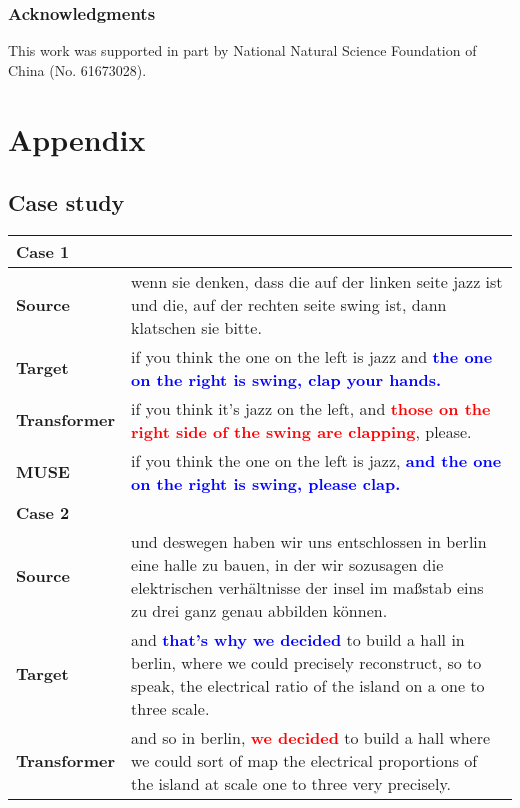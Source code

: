 \documentclass{article} \usepackage{iclr2020_conference,times}
\begin{document}
\subsubsection*{Acknowledgments}
This work was supported in part by National Natural Science Foundation of China (No. 61673028).





\newpage
\appendix
\section{Appendix}
\subsection{Case study}
\begin{table*}[ht]
\centering
\begin{tabular}{p{2cm}p{10cm}}
\toprule
\textbf{Case 1} & \\
\midrule
\textbf{Source} & wenn sie denken, dass die auf der linken seite jazz ist und die, auf der rechten seite swing ist, dann klatschen sie bitte. \\
\midrule
\textbf{Target} & if you think the one on the left is jazz and \textbf{\textcolor{blue}{the one on the right is swing, clap your hands.}} \\
\midrule
 \textbf{Transformer} & if you think it's jazz on the left, and \textbf{\textcolor{red}{those on the right side of the swing are clapping}}, please. \\
\midrule
\textbf{MUSE} & if you think the one on the left is jazz, \textbf{\textcolor{blue}{and the one on the right is swing, please clap.}} \\
\midrule\midrule
\textbf{Case 2} & \\
\midrule
\textbf{Source} & und deswegen haben wir uns entschlossen in berlin eine halle zu bauen, in der wir sozusagen die elektrischen verhältnisse der insel im maßstab eins zu drei ganz genau abbilden können. \\
\midrule
\textbf{Target} & and \textbf{\textcolor{blue}{that's why we decided}} to build a hall in berlin, where we could precisely reconstruct, so to speak, the electrical ratio of the island on a one to three scale. \\
\midrule
 \textbf{Transformer} & and so in berlin, \textbf{\textcolor{red}{we decided}} to build a hall where we could sort of map the electrical proportions of the island at scale one to three very precisely. \\

\end{tabular}
\end{table*}
\end{document}
